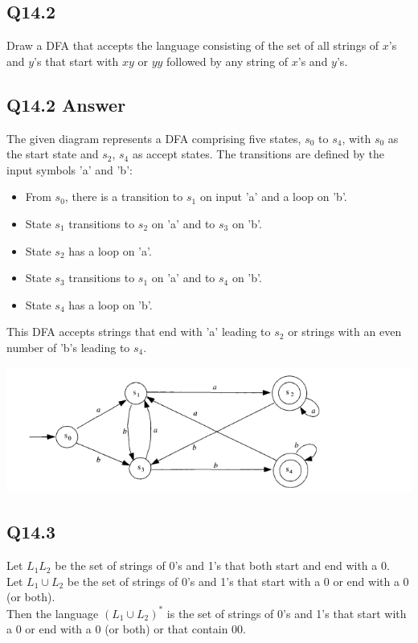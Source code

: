 \documentclass{article}
\begin{document}
\subsection*{Q14.2}
Draw a DFA that accepts the language consisting of the set of all strings of \( x \)'s and \( y \)'s that start with \( xy \) or \( yy \) followed by any string of \( x \)'s and \( y \)'s.
\newpage
{}
\subsection*{Q14.2 Answer}
The given diagram represents a DFA comprising five states, \( s_0 \) to \( s_4 \), with \( s_0 \) as the start state and \( s_2 \), \( s_4 \) as accept states. The transitions are defined by the input symbols 'a' and 'b':
\begin{itemize}
    \item From \( s_0 \), there is a transition to \( s_1 \) on input 'a' and a loop on 'b'.
    \item State \( s_1 \) transitions to \( s_2 \) on 'a' and to \( s_3 \) on 'b'.
    \item State \( s_2 \) has a loop on 'a'.
    \item State \( s_3 \) transitions to \( s_1 \) on 'a' and to \( s_4 \) on 'b'.
    \item State \( s_4 \) has a loop on 'b'.
\end{itemize}
This DFA accepts strings that end with 'a' leading to \( s_2 \) or strings with an even number of 'b's leading to \( s_4 \).
\begin{center}
    \includegraphics[width=15cm]{1.png}
\end{center}
\newpage
{}
\subsection*{Q14.3}
Let \( L_1L_2 \) be the set of strings of 0's and 1's that both start and end with a 0.
\\ Let \( L_1 \cup L_2 \) be the set of strings of 0's and 1's that start with a 0 or end with a 0 (or both).
\\ Then the language \( (L_1 \cup L_2)^* \) is the set of strings of 0's and 1's that start with a 0 or end with a 0 (or both) or that contain 00.
\newpage
{}
\end{document}
